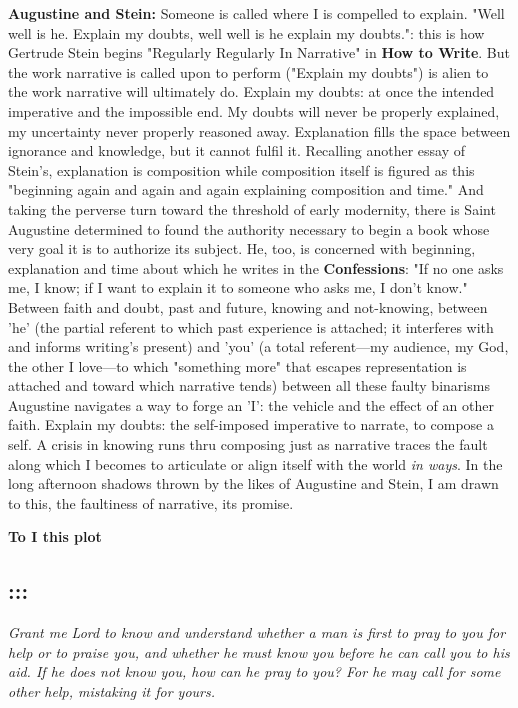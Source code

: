 \textbf{Augustine and Stein:} Someone is called where I is compelled to
explain. "Well well is he. Explain my doubts, well well is he explain my
doubts.": this is how Gertrude Stein begins "Regularly Regularly In
Narrative" in \textbf{How to Write}. But the work narrative is called
upon to perform ("Explain my doubts") is alien to the work narrative
will ultimately do. Explain my doubts: at once the intended imperative
and the impossible end. My doubts will never be properly explained, my
uncertainty never properly reasoned away. Explanation fills the space
between ignorance and knowledge, but it cannot fulfil it. Recalling
another essay of Stein's, explanation is composition while composition
itself is figured as this "beginning again and again and again
explaining composition and time." And taking the perverse turn toward
the threshold of early modernity, there is Saint Augustine determined to
found the authority necessary to begin a book whose very goal it is to
authorize its subject. He, too, is concerned with beginning, explanation
and time about which he writes in the \textbf{Confessions}: "If no one
asks me, I know; if I want to explain it to someone who asks me, I don't
know." Between faith and doubt, past and future, knowing and
not-knowing, between 'he' (the partial referent to which past experience
is attached; it interferes with and informs writing's present) and 'you'
(a total referent---my audience, my God, the other I love---to which
"something more" that escapes representation is attached and toward
which narrative tends) between all these faulty binarisms Augustine
navigates a way to forge an 'I': the vehicle and the effect of an other
faith. Explain my doubts: the self-imposed imperative to narrate, to
compose a self. A crisis in knowing runs thru composing just as
narrative traces the fault along which I becomes to articulate or align
itself with the world \emph{in ways}. In the long afternoon shadows
thrown by the likes of Augustine and Stein, I am drawn to this, the
faultiness of narrative, its promise.

\textbf{To I this plot}

\hypertarget{section-12}{%
\subsection{:::}\label{section-12}}

\emph{Grant me Lord to know and understand whether a man is first to
pray to you for help or to praise you, and whether he must know you
before he can call you to his aid. If he does not know you, how can he
pray to you? For he may call for some other help, mistaking it for
yours.}

